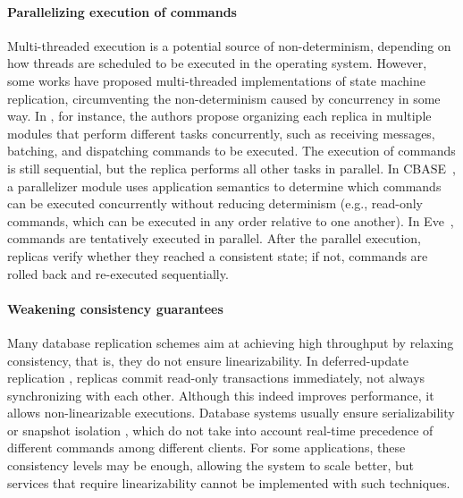 \paragraph{Parallelizing execution of commands}

Multi-threaded execution is a potential source of non-determinism, depending on
how threads are scheduled to be executed in the operating system. However, some
works have proposed multi-threaded implementations of state machine replication,
circumventing the non-determinism caused by concurrency in some way. In
\cite{santos2013htsmr}, for instance, the authors propose organizing each
replica in multiple modules that perform different tasks concurrently, such as
receiving messages, batching, and dispatching commands to be executed. The
execution of commands is still sequential, but the replica performs all other
tasks in parallel. In CBASE~\cite{Kotla:2004ep}, a parallelizer module uses
application semantics to determine which commands can be executed concurrently
without reducing determinism (e.g., read-only commands, which can be executed in
any order relative to one another). In Eve~\cite{Kapritsos:2012um}, commands are
tentatively executed in parallel. After the parallel execution, replicas verify
whether they reached a consistent state; if not, commands are rolled back and
re-executed sequentially.

\paragraph{Weakening consistency guarantees}

Many database replication schemes aim at achieving high throughput by relaxing
consistency, that is, they do not ensure linearizability. In deferred-update
replication \cite{chundi96dur, kobus2013hybrid, sciascia2012sdur, SousaOMP01},
replicas commit read-only transactions immediately, not always synchronizing
with each other. Although this indeed improves performance, it allows
non-linearizable executions. Database systems usually ensure serializability
\cite{BHG87} or snapshot isolation \cite{LinKJPA09}, which do not take into
account real-time precedence of different commands among different clients. For
some applications, these consistency levels may be enough, allowing the system
to scale better, but services that require linearizability cannot be implemented
with such techniques.

